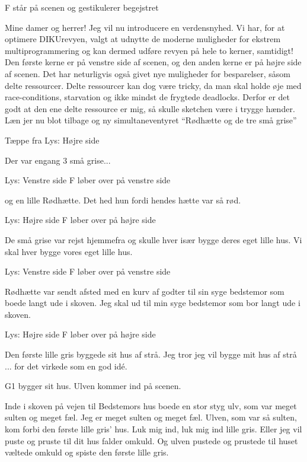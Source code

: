 \documentclass[a4paper,11pt]{article}
\begin{document}
  
\begin{sketch}

\scene F står på scenen og gestikulerer begejstret

 Mine damer og herrer! Jeg vil nu introducere en verdensnyhed.
 Vi har, for at optimere DIKUrevyen, valgt at udnytte de moderne muligheder for ekstrem multiprogrammering og kan dermed udføre revyen på hele to kerner, samtidigt!
	Den første kerne er på venstre side af scenen, og den anden kerne er på højre side af scenen.
 Det har neturligvis også givet nye muligheder for besparelser, såsom delte ressourcer.
	Delte ressourcer kan dog være tricky, da man skal holde øje med race-conditions, starvation og ikke mindst de frygtede deadlocks.
	Derfor er det godt at den ene delte ressource er mig, så skulle sketchen være i trygge hænder. 
 Læn jer nu blot tilbage og ny simultaneventyret ``Rødhætte og de tre små grise''

\scene Tæppe fra
\scene Lys: Højre side

 Der var engang 3 små grise... 

\scene Lys: Venstre side
\scene F løber over på venstre side

 og en lille Rødhætte. Det hed hun fordi hendes hætte var så rød.

\scene Lys: Højre side
\scene F løber over på højre side

 De små grise var rejst hjemmefra og skulle hver især bygge deres eget lille hus.
 Vi skal hver bygge vores eget lille hus.

\scene Lys: Venstre side
\scene F løber over på venstre side

 Rødhætte var sendt afsted med en kurv af godter til sin syge bedstemor som boede langt ude i skoven.
 Jeg skal ud til min syge bedstemor som bor langt ude i skoven. 

\scene Lys: Højre side
\scene F løber over på højre side

 Den første lille gris byggede sit hus af strå.
 Jeg tror jeg vil bygge mit hus af strå
 ... for det virkede som en god idé.

\scene G1 bygger sit hus.
\scene Ulven kommer ind på scenen.

 Inde i skoven på vejen til Bedstemors hus boede en stor styg ulv, som var meget sulten og meget fæl.
 Jeg er meget sulten og meget fæl.
 Ulven, som var så sulten, kom forbi den første lille gris' hus.
 Luk mig ind, luk mig ind lille gris. Eller jeg vil puste og pruste til dit hus falder omkuld.
 Og ulven pustede og prustede til huset væltede omkuld og spiste den første lille gris.


\end{sketch}
\end{document}
